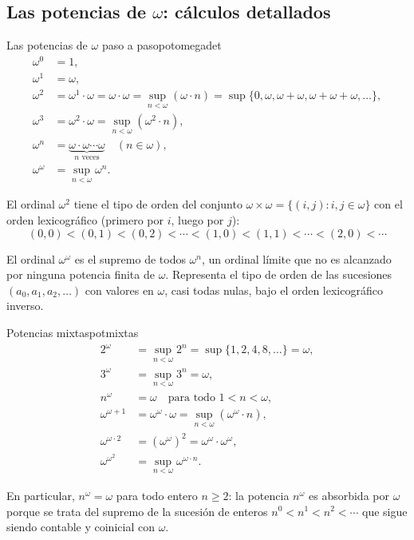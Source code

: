 \subsection{Las potencias de $\omega$: cálculos detallados}

\begin{ejemplo}{Las potencias de $\omega$ paso a paso}{potomegadet}
\begin{align*}
  \omega^0 &= 1, \\
  \omega^1 &= \omega, \\
  \omega^2 &= \omega^1 \cdot \omega = \omega \cdot \omega = \sup_{n<\omega}(\omega \cdot n)
    = \sup\{0,\omega,\omega+\omega,\omega+\omega+\omega,\ldots\}, \\
  \omega^3 &= \omega^2 \cdot \omega = \sup_{n<\omega}(\omega^2 \cdot n), \\
  \omega^n &= \underbrace{\omega \cdot \omega \cdots \omega}_{n\text{ veces}}
    \quad(n \in \omega), \\
  \omega^\omega &= \sup_{n<\omega} \omega^n.
\end{align*}

El ordinal $\omega^2$ tiene el tipo de orden del conjunto
$\omega \times \omega = \{(i,j) : i,j \in \omega\}$
con el orden lexicográfico (primero por $i$, luego por $j$):
\[
  (0,0) < (0,1) < (0,2) < \cdots < (1,0) < (1,1) < \cdots < (2,0) < \cdots
\]

El ordinal $\omega^\omega$ es el supremo de todos $\omega^n$, un ordinal límite que no es alcanzado por ninguna potencia finita de $\omega$. Representa el tipo de orden de las sucesiones $(a_0, a_1, a_2, \ldots)$ con valores en $\omega$, casi todas nulas, bajo el orden lexicográfico inverso.
\end{ejemplo}

\begin{ejemplo}{Potencias mixtas}{potmixtas}
\begin{align*}
  2^\omega &= \sup_{n<\omega} 2^n = \sup\{1, 2, 4, 8, \ldots\} = \omega, \\
  3^\omega &= \sup_{n<\omega} 3^n = \omega, \\
  n^\omega &= \omega \quad \text{para todo } 1 < n < \omega, \\
  \omega^{\omega+1} &= \omega^\omega \cdot \omega = \sup_{n<\omega}(\omega^\omega \cdot n), \\
  \omega^{\omega \cdot 2} &= (\omega^\omega)^2 = \omega^\omega \cdot \omega^\omega, \\
  \omega^{\omega^2} &= \sup_{n<\omega} \omega^{\omega \cdot n}.
\end{align*}

En particular, $n^\omega = \omega$ para todo entero $n \geq 2$: la potencia $n^\omega$ es absorbida por $\omega$ porque se trata del supremo de la sucesión de enteros $n^0 < n^1 < n^2 < \cdots$ que sigue siendo contable y coinicial con $\omega$.
\end{ejemplo}

